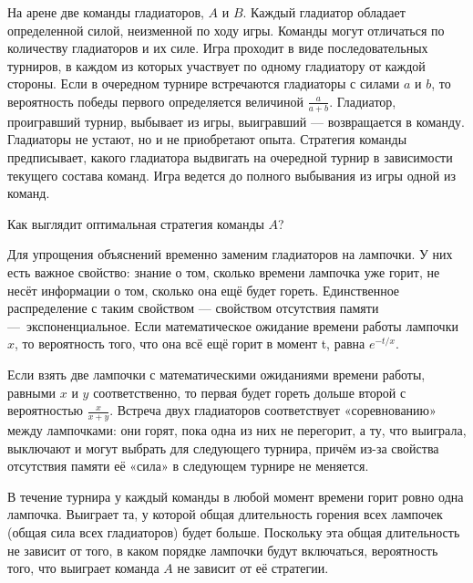 \documentclass[nobib]{tufte-handout}
\theoremstyle{definition}
\newcounter{problem}
\newenvironment{problem}%
{%
\refstepcounter{problem}%
     \hypertarget{problem:{\theproblem}}{}
     \Writetofile{solution_file}{\protect\hypertarget{soln:\theproblem}{}}
     \begin{myenum}[label=\bfseries\protect\hyperlink{soln:\theproblem}{\theproblem},ref=\theproblem]
     \item%
    }%
    {%
    \end{myenum}}
\begin{document}
\begin{problem}
На арене две команды гладиаторов,  $A$  и  $B$. Каждый гладиатор обладает определенной силой, неизменной по ходу игры. Команды могут отличаться по количеству гладиаторов и их силе. Игра проходит в виде последовательных турниров, в каждом из которых участвует по одному гладиатору от каждой стороны. Если в очередном турнире встречаются гладиаторы с силами  $a$  и  $b$, то вероятность победы первого определяется величиной  $\frac{a}{a+b}$. Гладиатор, проигравший турнир, выбывает из игры, выигравший — возвращается в команду. Гладиаторы не устают, но и не приобретают опыта. Стратегия команды предписывает, какого гладиатора выдвигать на очередной турнир в зависимости текущего состава команд. Игра ведется до полного выбывания из игры одной из команд.

Как выглядит оптимальная стратегия команды $A$?

\begin{sol}
Для упрощения объяснений временно заменим гладиаторов на лампочки. У них есть важное свойство: знание о том, сколько времени лампочка уже горит, не несёт информации о том, сколько она ещё будет гореть.
Единственное распределение с таким свойством — свойством отсутствия памяти — экспоненциальное. Если математическое ожидание времени работы лампочки $x$, то вероятность того, что она всё ещё горит в момент t, равна $e^{-t/x}$.

Если взять две лампочки с математическими ожиданиями времени работы, равными $x$ и $y$ соответственно, то первая будет гореть дольше второй с вероятностью $\frac{x}{x+y}$.
Встреча двух гладиаторов соответствует «соревнованию» между лампочками: они горят, пока одна из них не перегорит, а ту, что выиграла, выключают и могут выбрать для следующего турнира, причём из-за свойства отсутствия памяти её «сила» в следующем турнире не меняется.

В течение турнира у каждый команды в любой момент времени горит ровно одна лампочка. Выиграет та, у которой общая длительность горения всех лампочек (общая сила всех гладиаторов) будет больше.
Поскольку эта общая длительность не зависит от того, в каком порядке лампочки будут включаться, вероятность того, что выиграет команда $A$ не зависит от её стратегии.

\end{sol}

\end{problem}
\end{document}

